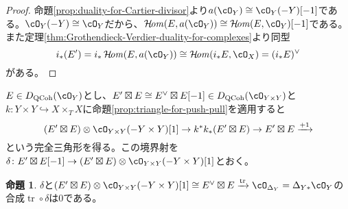 \documentclass[uplatex, a4paper, dvipdfmx]{jsarticle}
\theoremstyle{definition}
\newtheorem{proposition}[theorem]{命題}
\DeclareMathOperator{\CHom}{\mathcal{H}\!\mathit{om}}
\DeclareMathOperator{\QCoh}{\mathrm{QCoh}}
\DeclareMathOperator{\tr}{\mathrm{tr}}
\begin{document}
\begin{proof}
    命題\ref{prop:duality-for-Cartier-divisor}より$a(\cO_Y) \cong \cO_Y(-Y)[-1]$である。$\cO_Y(-Y) \cong \cO_Y$だから、$\CHom(E, a(\cO_Y)) \cong \CHom(E, \cO_Y)[-1]$である。
    また定理\ref{thm:Grothendieck-Verdier-duality-for-complexes}より同型
    \begin{equation}
        i_*(E') = i_* \CHom(E, a(\cO_Y)) \cong \CHom(i_*E, \cO_X) = (i_*E)^\vee
    \end{equation}
    がある。
\end{proof}
$E \in D_{\QCoh}(\cO_Y)$とし、$E' \boxtimes E \cong E^\vee \boxtimes E[-1] \in D_{\QCoh}(\cO_{Y\times Y})$と$k \colon Y \times Y \hookrightarrow X \times_T X$に命題\ref{prop:triangle-for-push-pull}を適用すると
\begin{equation}\label{eq:triangle-for-E-boxtimes-E}
    (E' \boxtimes E) \otimes \cO_{Y \times Y}(-Y\times Y)[1] \to k^*k_*(E' \boxtimes E) \to E' \boxtimes E \xrightarrow{+1}
\end{equation}
という完全三角形を得る。この境界射を$\delta \colon E' \boxtimes E[-1] \to (E' \boxtimes E) \otimes \cO_{Y \times Y}(-Y\times Y)[1]$とおく。
\begin{proposition}
    $\delta$と$(E' \boxtimes E) \otimes \cO_{Y \times Y}(-Y\times Y)[1] \cong E^\vee \boxtimes E \xrightarrow{\tr} \cO_{\Delta_Y} = \Delta_{Y*}\cO_Y$の合成$\tr \circ \delta$は$0$である。
\end{proposition}
\end{document}
